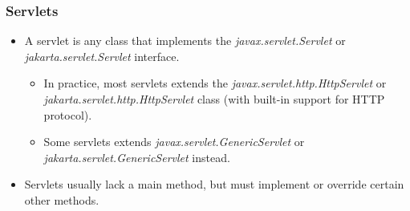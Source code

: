 \documentclass[10pt,xcolor=pdflatex]{beamer}
\begin{document}
\begin{frame}[fragile]\frametitle{Servlets}
	\begin{itemize}
    	\item A servlet is any class that implements the \emph{javax.servlet.Servlet} or \emph{jakarta.servlet.Servlet} interface.
        \begin{itemize}
        	\item In practice, most servlets extends the \emph{javax.servlet.http.HttpServlet} or \emph{jakarta.servlet.http.HttpServlet} class (with built-in support for HTTP protocol).
			\item Some servlets extends 				\emph{javax.servlet.GenericServlet} or \emph{jakarta.servlet.GenericServlet} instead.
        \end{itemize}
        \item Servlets usually lack a main method, but must implement or override certain other methods.
	\end{itemize}
\end{frame}
    
\end{document}
